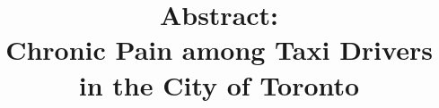 \documentclass[11pt]{article}
\begin{document}
\title{Abstract:\\Chronic Pain among Taxi Drivers in the City of
  Toronto}
\maketitle

\end{document}
